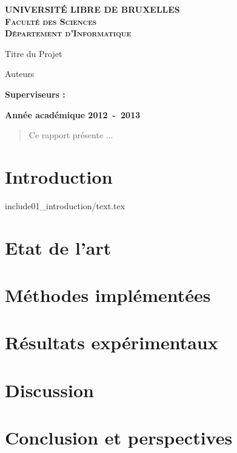 \documentclass[a4paper,10pt]{report}
\begin{document}
\begin{titlepage}
\begin{center}
\textbf{\textsc{UNIVERSIT\'E LIBRE DE BRUXELLES}}\\
\textbf{\textsc{Faculté des Sciences}}\\
\textbf{\textsc{Département d'Informatique}}
\vfill{}\vfill{}
\begin{center}{\Huge Titre du Projet}\end{center}{\Huge \par}
\begin{center}{\large Auteurs}\end{center}{\Huge \par}
\vfill{}\vfill{}
\begin{flushleft}{\large \textbf{Superviseurs :}}\hfill{}\end{flushleft}{\large\par}
\vfill{}\vfill{}\enlargethispage{3cm}
\textbf{Année académique 2012~-~2013}
\end{center}
\end{titlepage}

\begin{abstract}
Ce rapport présente ...
\end{abstract}


\tableofcontents


\chapter{Introduction}
include{01_introduction/text.tex}

\chapter{Etat de l'art}

\cite{spampinato2008detecting,trucco2006video}

\chapter{Méthodes implémentées}

\chapter{Résultats expérimentaux}

\chapter{Discussion}

\chapter{Conclusion et perspectives}




\end{document}
